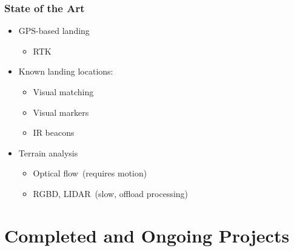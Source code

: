 \documentclass[aspectratio=169]{rubeamer}
\newif\ifpause
\newcommand{\mypause}{\ifpause \pause \fi}
\begin{document}
\begin{frame}
  \frametitle{State of the Art}
  \begin{itemize}
    \item GPS-based landing
    \mypause
    \begin{itemize}
      \item RTK
    \end{itemize}
    \mypause
    \item Known landing locations:
    \begin{itemize}
      \item Visual matching
      \mypause
      \item Visual markers
      \mypause
      \item IR beacons
    \end{itemize}
    \mypause
    \item Terrain analysis
    \begin{itemize}
      \item Optical flow\mypause~(requires motion)
      \mypause
      \item RGBD, LIDAR\mypause~(slow, offload processing)
    \end{itemize}
  \end{itemize}

\end{frame}

\section{Completed and Ongoing Projects}
\end{document}
